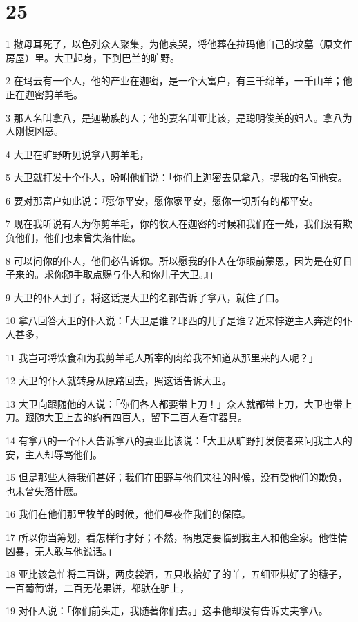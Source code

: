 \chapter{25}

\par 1 撒母耳死了，以色列众人聚集，为他哀哭，将他葬在拉玛他自己的坟墓（原文作房屋）里。大卫起身，下到巴兰的旷野。
\par 2 在玛云有一个人，他的产业在迦密，是一个大富户，有三千绵羊，一千山羊；他正在迦密剪羊毛。
\par 3 那人名叫拿八，是迦勒族的人；他的妻名叫亚比该，是聪明俊美的妇人。拿八为人刚愎凶恶。
\par 4 大卫在旷野听见说拿八剪羊毛，
\par 5 大卫就打发十个仆人，吩咐他们说：「你们上迦密去见拿八，提我的名问他安。
\par 6 要对那富户如此说：『愿你平安，愿你家平安，愿你一切所有的都平安。
\par 7 现在我听说有人为你剪羊毛，你的牧人在迦密的时候和我们在一处，我们没有欺负他们，他们也未曾失落什麽。
\par 8 可以问你的仆人，他们必告诉你。所以愿我的仆人在你眼前蒙恩，因为是在好日子来的。求你随手取点赐与仆人和你儿子大卫。』」
\par 9 大卫的仆人到了，将这话提大卫的名都告诉了拿八，就住了口。
\par 10 拿八回答大卫的仆人说：「大卫是谁？耶西的儿子是谁？近来悖逆主人奔逃的仆人甚多，
\par 11 我岂可将饮食和为我剪羊毛人所宰的肉给我不知道从那里来的人呢？」
\par 12 大卫的仆人就转身从原路回去，照这话告诉大卫。
\par 13 大卫向跟随他的人说：「你们各人都要带上刀！」众人就都带上刀，大卫也带上刀。跟随大卫上去的约有四百人，留下二百人看守器具。
\par 14 有拿八的一个仆人告诉拿八的妻亚比该说：「大卫从旷野打发使者来问我主人的安，主人却辱骂他们。
\par 15 但是那些人待我们甚好；我们在田野与他们来往的时候，没有受他们的欺负，也未曾失落什麽。
\par 16 我们在他们那里牧羊的时候，他们昼夜作我们的保障。
\par 17 所以你当筹划，看怎样行才好；不然，祸患定要临到我主人和他全家。他性情凶暴，无人敢与他说话。」
\par 18 亚比该急忙将二百饼，两皮袋酒，五只收拾好了的羊，五细亚烘好了的穗子，一百葡萄饼，二百无花果饼，都驮在驴上，
\par 19 对仆人说：「你们前头走，我随著你们去。」这事他却没有告诉丈夫拿八。
